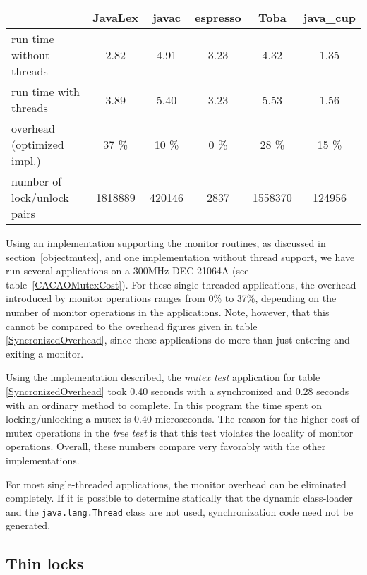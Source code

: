 \begin{table*}
\begin{center}
\begin{tabular}[b]{|l|c|c|c|c|c|}
\hline 
                             & JavaLex &  javac & espresso &  Toba   &
java\_cup \\ \hline
run time without threads     &   2.82  &   4.91 &    3.23  &   4.32 
&    1.35   \\ \hline
run time with threads        &   3.89  &   5.40 &    3.23  &   5.53 
&    1.56   \\ \hline
overhead (optimized impl.)   &   37 \% &  10 \% &    0 \%  &   28 \%
&    15 \%  \\ \hline
number of lock/unlock pairs  & 1818889 & 420146 &   2837   & 1558370 & 
124956   \\ \hline
\end{tabular}
\caption{Overhead of monitor operations}
\label{CACAOMutexCost}
\end{center}
\end{table*}

Using an implementation supporting the monitor routines, as discussed
in section~\ref{objectmutex}, and one implementation without thread
support, we have run several applications on a 300MHz DEC 21064A (see
table~\ref{CACAOMutexCost}). For these single threaded applications,
the overhead introduced by monitor operations ranges from 0\% to 37\%,
depending on the number of monitor operations in the applications. 
Note, however, that this cannot be compared to the overhead figures
given in table \ref{SyncronizedOverhead}, since these applications do
more than just entering and exiting a monitor.

Using the implementation described, the {\em mutex test} application
for table \ref{SyncronizedOverhead} took 0.40 seconds with a
synchronized and 0.28 seconds with an ordinary method to complete. In
this program the time spent on locking/unlocking a mutex is 0.40
microseconds. The reason for the higher cost of mutex operations in
the {\em tree test} is that this test violates the locality of monitor
operations. Overall, these numbers compare very favorably with the
other implementations.

For most single-threaded applications, the monitor overhead can be
eliminated completely. If it is possible to determine statically that
the dynamic class-loader and the \texttt{java.lang.Thread} class are
not used, synchronization code need not be generated.


\subsection{Thin locks}


